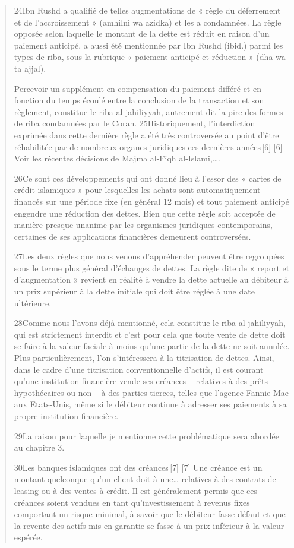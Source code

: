 \begin{quote}
24Ibn Rushd a qualifié de telles augmentations de « règle du déferrement et de l’accroissement » (amhilni wa azidka) et les a condamnées. La règle opposée selon laquelle le montant de la dette est réduit en raison d’un paiement anticipé, a aussi été mentionnée par Ibn Rushd (ibid.) parmi les types de riba, sous la rubrique « paiement anticipé et réduction » (dha wa ta ajjal).

Percevoir un supplément en compensation du paiement différé et en fonction du temps écoulé entre la conclusion de la transaction et son règlement, constitue le riba al-jahiliyyah, autrement dit la pire des formes de riba condamnées par le Coran.
25Historiquement, l’interdiction exprimée dans cette dernière règle a été très controversée au point d’être réhabilitée par de nombreux organes juridiques ces dernières années [6]
[6]
Voir les récentes décisions de Majma al-Fiqh al-Islami,….

26Ce sont ces développements qui ont donné lieu à l’essor des « cartes de crédit islamiques » pour lesquelles les achats sont automatiquement financés sur une période fixe (en général 12 mois) et tout paiement anticipé engendre une réduction des dettes. Bien que cette règle soit acceptée de manière presque unanime par les organismes juridiques contemporains, certaines de ses applications financières demeurent controversées.

27Les deux règles que nous venons d’appréhender peuvent être regroupées sous le terme plus général d’échanges de dettes. La règle dite de « report et d’augmentation » revient en réalité à vendre la dette actuelle au débiteur à un prix supérieur à la dette initiale qui doit être réglée à une date ultérieure.

28Comme nous l’avons déjà mentionné, cela constitue le riba al-jahiliyyah, qui est strictement interdit et c’est pour cela que toute vente de dette doit se faire à la valeur faciale à moins qu’une partie de la dette ne soit annulée. Plus particulièrement, l’on s’intéressera à la titrisation de dettes. Ainsi, dans le cadre d’une titrisation conventionnelle d’actifs, il est courant qu’une institution financière vende ses créances – relatives à des prêts hypothécaires ou non – à des parties tierces, telles que l’agence Fannie Mae aux Etats-Unis, même si le débiteur continue à adresser ses paiements à sa propre institution financière.

29La raison pour laquelle je mentionne cette problématique sera abordée au chapitre 3.

30Les banques islamiques ont des créances [7]
[7]
Une créance est un montant quelconque qu’un client doit à une… relatives à des contrats de leasing ou à des ventes à crédit. Il est généralement permis que ces créances soient vendues en tant qu’investissement à revenus fixes comportant un risque minimal, à savoir que le débiteur fasse défaut et que la revente des actifs mis en garantie se fasse à un prix inférieur à la valeur espérée.


\end{quote}
